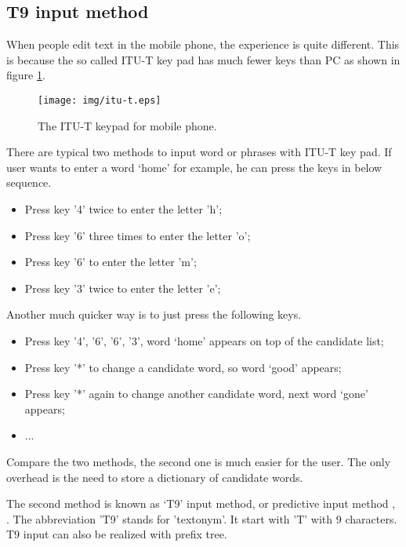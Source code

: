 \documentclass{article}
\begin{document}

\subsection{T9 input method}

When people edit text in the mobile phone, the experience is quite different.
This is because the so called ITU-T key pad has much fewer
keys than PC as shown in figure \ref{fig:itut-keypad}.

\begin{figure}[htbp]
  \centering
  \texttt{[image: img/itu-t.eps]}
  \caption{The ITU-T keypad for mobile phone.}
  \label{fig:itut-keypad}
\end{figure}

There are typical two methods to input word or phrases with ITU-T key pad.
If user wants to enter a word `home' for example, he can press the keys
in below sequence.

\begin{itemize}
\item Press key '4' twice to enter the letter 'h';
\item Press key '6' three times to enter the letter 'o';
\item Press key '6' to enter the letter 'm';
\item Press key '3' twice to enter the letter 'e';
\end{itemize}

Another much quicker way is to just press the following keys.

\begin{itemize}
\item Press key '4', '6', '6', '3', word `home' appears on top of the candidate list;
\item Press key '*' to change a candidate word, so word `good' appears;
\item Press key '*' again to change another candidate word, next word `gone' appears;
\item ...
\end{itemize}

Compare the two methods, the second one is much easier for the user.
The only overhead is the need to store a dictionary of candidate words.

The second method is known as `T9' input method, or predictive input method
\cite{wiki-t9}, \cite {wiki-predictive-text}. The abbreviation 'T9' stands
for 'textonym'. It start with 'T' with 9 characters. T9 input can also be
realized with prefix tree.
\end{document}
